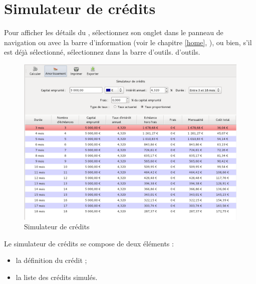 
\ifIllustration
\else
\newpage
\fi


\section{Simulateur de crédits\label{credit-simulation}}


Pour afficher les détails du , sélectionnez son onglet dans le panneau de navigation ou avec la barre d'information (voir le chapitre \vref{home}, ), ou bien, s'il est déjà sélectionné, sélectionnez  dans la barre \ifIllustration d'outils.
\else d'outils.
\fi

\ifIllustration
\begin{figure}[htb]
\begin{center}
\includegraphics[scale=0.5]{image/screenshot/credit_simulation}
\end{center}
\caption{Simulateur de crédits}
\label{credit-simulation-img}
\end{figure}
\fi
 
Le simulateur de crédits se compose de deux éléments :
\begin{itemize}
	 \item la définition du crédit ; 
	 \item la liste des crédits simulés.
\end{itemize}


